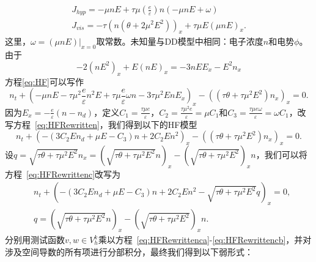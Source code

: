 $$
    \begin{gathered}
        J_{h y p}=-\mu n E+\tau \mu\left(\frac{e}{\varepsilon}\right) n(-\mu n E+\omega) \\
        J_{v i s}=-\tau\left(n\left(\theta+2 \mu^{2} E^{2}\right)\right)_{x}+\tau \mu E(\mu n E)_{x} .
    \end{gathered}
$$
这里，$\omega=\left.(\mu n E)\right|_{x=0}$取常数。未知量与DD模型中相同：电子浓度$n$和电势$\phi$。由于
$$
    -2\left(n E^{2}\right)_{x}+E(n E)_{x}=-3 n E E_{x}-E^{2} n_{x}
$$
方程\eqref{eq:HF}可以写作
\begin{equation}
    n_{t}+\left(-\mu n E-\tau \mu^{2} \frac{e}{\varepsilon} n^{2} E+\tau \mu \frac{e}{\varepsilon} \omega n-3 \tau \mu^{2} E n E_{x}\right)_{x}-\left(\left(\tau \theta+\tau \mu^{2} E^{2}\right) n_{x}\right)_{x}=0.\label{eq:HFRewritten}
\end{equation}
因为$E_{x}=-\frac{e}{\varepsilon}\left(n-n_{d}\right)$，定义$C_{1}=\frac{\tau \mu e}{\varepsilon}$，$C_{2}=\frac{\tau \mu^{2} e}{\varepsilon}=\mu C_{1}$和$C_{3}=\frac{\tau \mu e \omega}{\varepsilon}=\omega C_{1}$，改写方程~\eqref{eq:HFRewritten}，我们得到以下的HF模型
\begin{equation}
    n_{t}+\left(-\left(3 C_{2} E n_{d}+\mu E-C_{3}\right) n+2 C_{2} E n^{2}\right)_{x}-\left(\left(\tau \theta+\tau \mu^{2} E^{2}\right) n_{x}\right)_{x}=0 .  \label{eq:HFRewrittenc}
\end{equation}
设$q=\sqrt{\tau \theta+\tau \mu^{2} E^{2}} n_{x}=\left(\sqrt{\tau \theta+\tau \mu^{2} E^{2}} n\right)_{x}-\left(\sqrt{\tau \theta+\tau \mu^{2} E^{2}}\right)_{x} n$，我们可以将方程~\eqref{eq:HFRewrittenc}改写为
\begin{align}
     & n_{t}+\left(-\left(3 C_{2} E n_{d}+\mu E-C_{3}\right) n+2 C_{2} E n^{2}-\sqrt{\tau \theta+\tau \mu^{2} E^{2}} q\right)_{x}=0, \label{eq:HFRewrittenca} \\
     & q=\left(\sqrt{\tau \theta+\tau \mu^{2} E^{2}} n\right)_{x}-\left(\sqrt{\tau \theta+\tau \mu^{2} E^{2}}\right)_{x} n.\label{eq:HFRewrittencb}
\end{align}
分别用测试函数$v, w \in V_{h}^{k}$乘以方程~\eqref{eq:HFRewrittenca}-\eqref{eq:HFRewrittencb}，并对涉及空间导数的所有项进行分部积分，最终我们得到以下弱形式：
